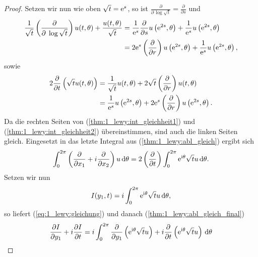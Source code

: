 \begin{proof}
Setzen wir nun wie oben $\sqrt{t}=\mathrm e^s$, so ist $\frac{\partial}{\partial \,\log \sqrt{t}}=\frac{\partial}{\partial s}$ und
\begin{align}\label{thm:1_lewy:int_gleichheit1}
\begin{split}
\frac{1}{\sqrt{t}}\left(\frac{\partial}{\partial\;\log\sqrt{t}}\right)u(t,\theta) + \frac{u(t,\theta)}{\sqrt{t}}
&= \frac{1}{\mathrm e^s} \frac{\partial}{\partial s} u\left(\mathrm e^{2s},\theta\right)+\frac{1}{\mathrm e^s}u\left(\mathrm e^{2s},\theta\right) \\
&= 2\mathrm e^s \left(\frac{\partial}{\partial r}\right) u\left(\mathrm e^{2s},\theta\right)+\frac{1}{\mathrm e^s} u\left(\mathrm e^{2s},\theta\right),
\end{split}
\end{align}
sowie
\begin{align}\label{thm:1_lewy:int_gleichheit2}
\begin{split}
2\frac{\partial}{\partial t}\left(\sqrt{t} u(t,\theta)\right) 
&= \frac{1}{\sqrt{t}}u(t,\theta)+2\sqrt{t}\left(\frac{\partial}{\partial r}\right)u(t,\theta)\\
&= \frac{1}{\mathrm e^s}u\left(\mathrm e^{2s},\theta\right) +2 \mathrm e^s \left(\frac{\partial}{\partial r}\right)u\left(\mathrm e^{2s},\theta\right).
\end{split}
\end{align}
Da die rechten Seiten von (\ref{thm:1_lewy:int_gleichheit1}) und (\ref{thm:1_lewy:int_gleichheit2}) übereinstimmen, sind auch die linken Seiten gleich. Eingesetzt in das letzte Integral aus (\ref{thm:1_lewy:abl_gleich}) ergibt sich
\begin{align}\label{thm:1_lewy:abl_gleich_final}
\begin{split}
\int_0^{2\pi} \left(\frac{\partial}{\partial x_1} +i\frac{\partial}{\partial x_2}\right)u\,\mathrm d\theta 
= 2\left(\frac{\partial}{\partial t}\right)\int_0^{2\pi} \mathrm e^{\mathrm i\theta}\sqrt{t}u\,\mathrm d\theta.
\end{split}
\end{align}
Setzen wir nun 
\begin{equation}
I(y_1,t)=i\int_0^{2\pi} \mathrm e^{\mathrm i\theta} \sqrt{t}u\,\mathrm d\theta,
\end{equation}
so liefert (\ref{eq:1_lewy:gleichung}) und danach (\ref{thm:1_lewy:abl_gleich_final})
\begin{align}
\begin{split}
\frac{\partial I}{\partial y_1} +i\frac{\partial I}{\partial t} 
&= i\int_{0}^{2\pi} \frac{\partial}{\partial y_1}\left(\e^{\i\theta}\sqrt{t}u\right)+i\frac{\partial}{\partial t}\left(\e^{\i\theta}\sqrt{t}u\right)\d\theta \\

\end{split}
\end{align}
\end{proof}
